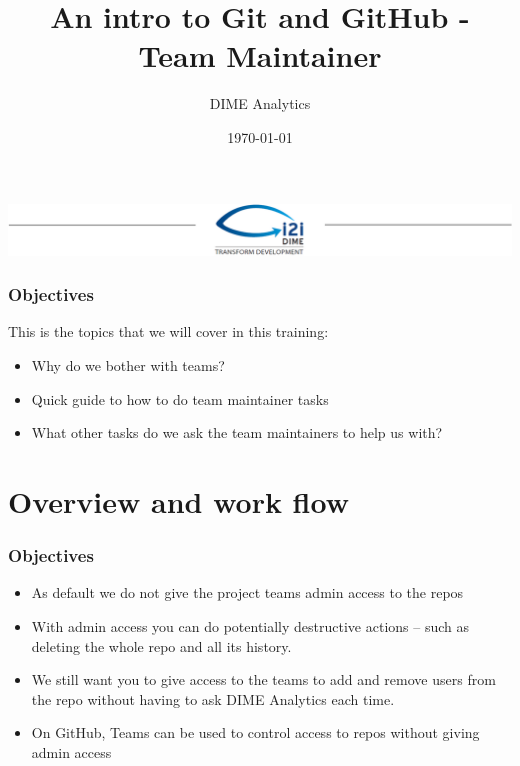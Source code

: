 \documentclass[aspectratio=169]{beamer} %
\title{An intro to Git and GitHub - Team Maintainer}
\author{DIME Analytics}
\institute{DIME - The World Bank - \trainingURL{https://www.worldbank.org/en/research/dime}}
\date{\today}
\begin{document}
\begin{frame}
\includegraphics[width=\textwidth]{../../Common-Resources/img/Header.png}
\vspace{-0.2cm}
\titlepage 	 %
\end{frame}

\begin{frame}
\frametitle{Objectives}

This is the topics that we will cover in this training:
	\begin{itemize}
		\item Why do we bother with teams?
		\item Quick guide to how to do team maintainer tasks
		\item What other tasks do we ask the team maintainers to help us with?
	\end{itemize}
\end{frame}



\section{Overview and work flow}

\begin{frame}
	\frametitle{Objectives}
	
	\begin{itemize}
		\item As default we do not give the project teams admin access to the repos
		
		\item With admin access you can do potentially destructive actions -- such as deleting the whole repo and all its history. 
		
		\item We still want you to give access to the teams to add and remove users from the repo without having to ask DIME Analytics each time.
		
		\item On GitHub, Teams can be used to control access to repos without giving admin access

	\end{itemize}
\end{frame}
\end{document}
